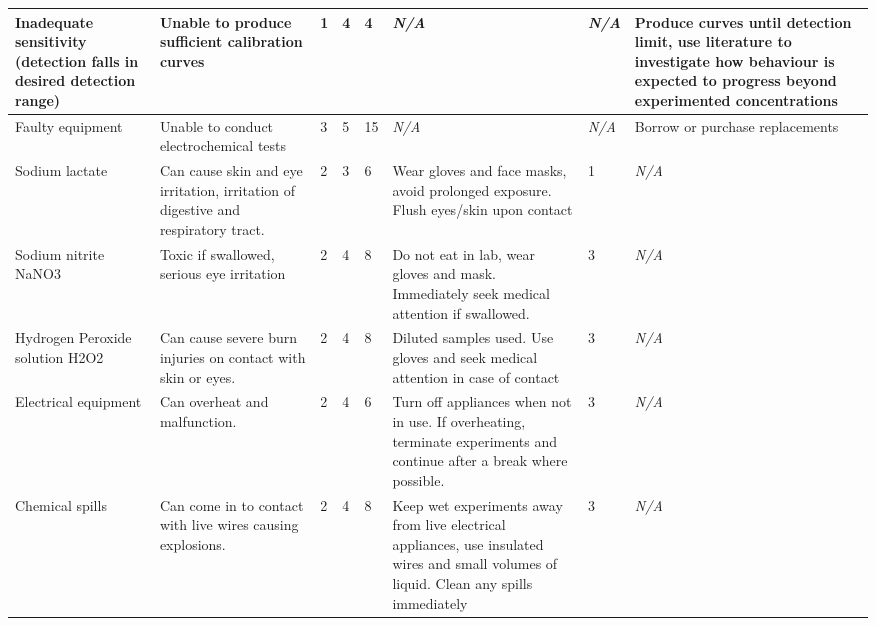 \begin{appendices}
\begin{longtable}{|p{}|p{}|p{}|p{}|p{}|p{}|p{}|p{}|}
        Inadequate sensitivity (detection falls in desired detection range) & Unable to produce sufficient calibration curves & 1 & 4 & 4 & \textit{N/A} & \textit{N/A} & Produce curves until detection limit, use literature to investigate how behaviour is expected to progress beyond experimented concentrations \\ \hline
        
        Faulty equipment & Unable to conduct electrochemical tests & 3 & 5 & 15 & \textit{N/A} & \textit{N/A} & Borrow or purchase replacements\\ \hline
        
        Sodium lactate & Can cause skin and eye irritation, irritation of digestive and respiratory tract. & 2 & 3 & 6 & Wear gloves and face masks, avoid prolonged exposure. Flush eyes/skin upon contact & 1 & \textit{N/A}\\ \hline
        
        Sodium nitrite NaNO3 & Toxic if swallowed, serious eye irritation & 2 & 4 & 8 & Do not eat in lab, wear gloves and mask. Immediately seek medical attention if swallowed. & 3 & \textit{N/A}\\ \hline
        
        \pagebreak
        
        Hydrogen Peroxide solution H2O2 &  Can cause severe burn injuries on contact with skin or eyes. & 2 & 4 & 8 & Diluted samples used. Use gloves and seek medical attention in case of contact & 3 & \textit{N/A}\\ \hline
        
        
        Electrical equipment & Can overheat and malfunction. & 2 & 4 & 6 & Turn off appliances when not in use. If overheating, terminate experiments and continue after a break where possible. & 3 & \textit{N/A}\\ \hline
        
        Chemical spills & Can come in to contact with live wires causing explosions. & 2 & 4 & 8 & Keep wet experiments away from live electrical appliances, use insulated wires and small volumes of liquid. Clean any spills immediately & 3 & \textit{N/A}\\ \hline
    \end{longtable}




\end{appendices}
